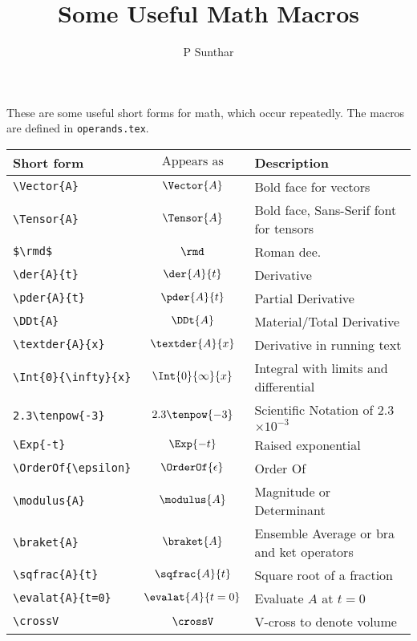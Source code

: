 \documentclass{article}
\begin{document}
\title{Some Useful Math Macros}
\author{P Sunthar}
\maketitle

These are some useful short forms for math, which occur repeatedly.
The macros are defined in \verb|operands.tex|.

\begin{longtable}{l>{$\displaystyle}c<{$}|l}
    \toprule
    Short form  & \text{Appears as} & Description \\
    \midrule
     \verb|\Vector{A}| & \Vector{A} & Bold face for vectors \\
     \verb|\Tensor{A}| & \Tensor{A} & Bold face, Sans-Serif font for tensors \\
     \verb|$\rmd$| & \rmd & Roman dee.\\
     \verb|\der{A}{t}| & \der{A}{t} & Derivative \\
     \verb|\pder{A}{t}| & \pder{A}{t} & Partial Derivative \\
     \verb|\DDt{A}| & \DDt{A} & Material/Total Derivative \\
     \verb|\textder{A}{x}| & \textder{A}{x} & Derivative in running
     text \\
     \verb|\Int{0}{\infty}{x}| & \Int{0}{\infty}{x}& Integral with
     limits and differential \\
     \verb|2.3\tenpow{-3}| & 2.3\tenpow{-3} &  Scientific Notation of
     2.3$\times 10^{-3}$ \\
     \verb|\Exp{-t}| & \Exp{-t} & Raised exponential \\
     \verb|\OrderOf{\epsilon}| & \OrderOf{\epsilon} & Order Of\\
     \verb|\modulus{A}| & \modulus{A} & Magnitude or Determinant\\
     \verb|\braket{A}| & \braket{A} & Ensemble Average or bra and ket
     operators\\
     \verb|\sqfrac{A}{t}| & \sqfrac{A}{t} & Square root of a fraction\\
     \verb|\evalat{A}{t=0}| & \evalat{A}{t=0} & Evaluate $A$ at $t=0$\\
     \verb|\crossV| & \crossV & V-cross to denote volume\\
    \bottomrule
\end{longtable}
\end{document}
